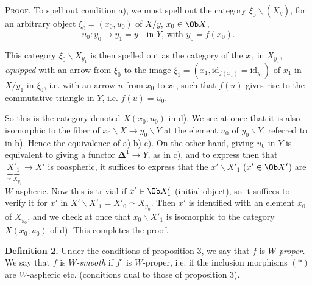 \textsc{Proof.} To spell out condition a), we must spell out the category $\xi_0\backslash(X_y)$, for an arbitrary object $\xi_0 = (x_0, u_0)$ of $X/y$, $x_0 \in \Ob X$,
\[
u_0 : y_0 \longrightarrow y_1 = y \quad \text{in $Y$, with $y_0 = f(x_0)$.}
\]

This category $\xi_0\backslash X_{y_1}$ is then spelled out as the category of the $x_1$ in $X_{y_1}$, \textit{equipped} with an arrow from $\xi_0$ to the image $\xi_1 = (x_1, \mathrm{id}_{f(x_1)} = \mathrm{id}_{y_1})$ of $x_1$ in $X/y_1$ in $\xi_0$, i.e. with an arrow $u$ from $x_0$ to $x_1$, such that $f(u)$ gives rise to the commutative triangle in $Y$, i.e. $f(u) = u_0$. %

\begin{center}
\end{center}

So this is the category denoted $X(x_0;u_0)$ in d). We see at once that it is also isomorphic to the fiber of $x_0\backslash X \longrightarrow y_0\backslash Y$ at the element $u_0$ of $y_0\backslash Y$, referred to in b). Hence the equivalence of a) b) c). On the other hand, giving $u_0$ in $Y$ is equivalent to giving a functor $\mathbf{\Delta}^1 \longrightarrow Y$, as in c), and to express then that $\underbrace{X'_1}_{\simeq X_{y_1}} \longrightarrow X'$ is coaspheric, it suffices to express that the $x'\backslash X'_1$ ($x' \in \Ob X'$) are $W$-aspheric. Now this is trivial if $x' \in \Ob X'_1$ (initial object), so it suffices to verify it for $x'$ in $X'\backslash X'_1 = X'_0 \simeq X_{y_0}$. Then $x'$ is identified with an element $x_0$ of $X_{y_0}$, and we check at once that $x_0\backslash X'_1$ is isomorphic to the category $X(x_0;u_0)$ of d). This completes the proof.


\textbf{Definition 2.} Under the conditions of proposition 3, we say that $f$ is \textit{$W$-proper.} We say that $f$ is \textit{$W$-smooth} if $f^{\circ}$ is $W$-proper, i.e. if the inclusion morphisms $(*)$ are $W$-aspheric etc. (conditions dual to those of proposition 3).

